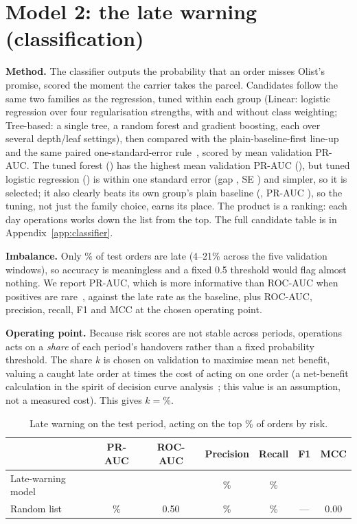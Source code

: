 \documentclass[12pt,a4paper]{article}
\begin{document}
\section*{Model 2: the late warning (classification)}
\textbf{Method.} The classifier outputs the probability that an order misses Olist's promise, scored the moment the carrier takes the parcel. Candidates follow the same two families as the regression, tuned within each group (Linear: logistic regression over four regularisation strengths, with and without class weighting; Tree-based: a single tree, a random forest and gradient boosting, each over several depth/leaf settings), then compared with the plain-baseline-first line-up and the same paired one-standard-error rule~\cite{james2013}, scored by mean validation PR-AUC. The tuned forest (\ClsBestName{}) has the highest mean validation PR-AUC (\ValBestPR{}), but tuned logistic regression (\ClsSelName{}) is within one standard error (gap \ClsSelGap{}, SE \ClsSelGapSE{}) and simpler, so it is selected; it also clearly beats its own group's plain baseline (\ClsPlainName{}, PR-AUC \ClsPlainPR{}), so the tuning, not just the family choice, earns its place. The product is a ranking: each day operations works down the list from the top. The full candidate table is in Appendix~\ref{app:classifier}.

\textbf{Imbalance.} Only \ClsTestLate{}\% of test orders are late (4--21\% across the five validation windows), so accuracy is meaningless and a fixed 0.5 threshold would flag almost nothing. We report PR-AUC, which is more informative than ROC-AUC when positives are rare~\cite{saito2015}, against the late rate as the baseline, plus ROC-AUC, precision, recall, F1 and MCC at the chosen operating point.

\textbf{Operating point.} Because risk scores are not stable across periods, operations acts on a \emph{share} of each period's handovers rather than a fixed probability threshold. The share \(k\) is chosen on validation to maximise mean net benefit, valuing a caught late order at \BenefitRatio{} times the cost of acting on one order (a net-benefit calculation in the spirit of decision curve analysis~\cite{vickers2006}; this value is an assumption, not a measured cost). This gives \(k=\)\ActShare{}\%.

\begin{table}[ht]
\centering\small
\caption{Late warning on the test period, acting on the top \ActShare{}\% of orders by risk.}
\label{tab:classifier-test}
\begin{tabular}{@{}lcccccc@{}}
\toprule
& PR-AUC & ROC-AUC & Precision & Recall & F1 & MCC \\
\midrule
Late-warning model & \ClsTestPR{} & \ClsTestROC{} & \ClsTestPrec{}\% & \ClsTestRec{}\% & \ClsTestFone{} & \ClsTestMCC{} \\
Random list & \ClsTestLate{}\% & 0.50 & \ClsTestLate{}\% & \ActShare{}\% & --- & 0.00 \\
\bottomrule
\end{tabular}
\end{table}
\end{document}
